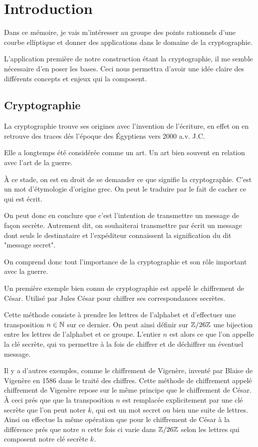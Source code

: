 \chapter{Introduction}

Dans ce mémoire, je vais m'intéresser au groupe des points rationnels d'une courbe elliptique
et donner des applications dans le
domaine de la cryptographie.

L'application première de notre construction étant la cryptographie, il me semble nécessaire
d'en poser les bases. Ceci nous permettra d'avoir une idée claire
des différents concepts et enjeux qui la composent.

\section{Cryptographie}

La cryptographie trouve ses origines avec l'invention de l'écriture, en effet on en
retrouve des traces dés l'époque des Égyptiens vers 2000 a.v. J.C.

Elle a longtemps été considérée comme un art. Un art bien souvent en relation avec l'art de
la guerre.

À ce stade, on est en droit de se demander ce que signifie la cryptographie. C'est un mot
d'étymologie d'origine grec. On peut le traduire par le fait de cacher ce qui est écrit.

On peut donc en conclure que c'est l'intention de transmettre un message de façon secrète.
Autrement dit, on souhaiterai transmettre par écrit un message dont seuls le destinataire
et l'expéditeur connaissent la signification du dit "message secret". 

On comprend donc tout l'importance de la cryptographie et son rôle important avec la
guerre.

Un première exemple bien connu de cryptographie est appelé le chiffrement de César. Utilisé par
Jules César pour chiffrer ses correspondances secrètes.

Cette méthode consiste à
prendre les lettres de l'alphabet et d'effectuer une transposition $n \in \mathbb{N}$ sur ce
dernier. On peut
ainsi définir sur $\mathbb{Z} / 26\mathbb{Z}$ une bijection entre les lettres de l'alphabet et ce groupe.
L'entier $n$ est alors ce que l'on appelle la clé secrète, qui va permettre à la fois de
chiffrer et de déchiffrer un éventuel message.

Il y a d'autres exemples, comme le chiffrement de Vigenère, inventé par Blaise de Vigenère en
1586 dans le traité des chiffres. Cette méthode de chiffrement appelé chiffrement de Vigenère repose sur le même principe que
le chiffrement de César. À ceci prés que que la transposition $n$ est remplacée explicitement
par une clé secrète que l'on peut noter $k$, qui est un mot secret ou bien une suite de
lettres.
Ainsi on effectue la même opération que pour le chiffrement de César à la différence prés que
notre $n$ cette fois ci varie dans $\mathbb{Z} / 26\mathbb{Z}$ selon les lettres qui composent notre clé secrète $k$.

